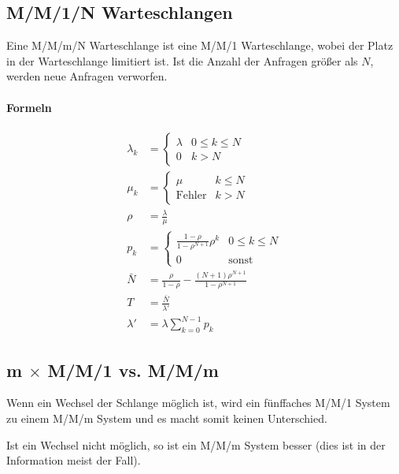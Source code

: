 		\subsection{M/M/1/N Warteschlangen} %
			Eine M/M/m/N Warteschlange ist eine M/M/1 Warteschlange, wobei der Platz in der Warteschlange limitiert ist. Ist die Anzahl der Anfragen größer als \(N\), werden neue Anfragen verworfen.
			
			\paragraph{Formeln}
				\begin{align*}
					\lambda _ k & = \begin{cases}
						\lambda & 0 \leq k \leq N \\
						0       & k > N
					\end{cases} \\
					\mu _ k     & = \begin{cases}
						\mu & k \leq N \\
						\text{Fehler} & k > N
					\end{cases} \\
					\rho        & = \frac{\lambda}{\mu} \\
					p _ k       & = \begin{cases}
						\frac{1 - \rho}{1 - \rho ^ {N + 1}} \rho ^ k & 0 \leq k \leq N \\
						0 & \text{sonst}
					\end{cases} \\
					\bar{N}     & = \frac{\rho}{1 - \rho} - \frac{(N + 1) \rho ^ { N + 1 }}{1 - \rho ^ { N + 1 }} \\
					T           & = \frac{\bar{N}}{\lambda'} \\
					\lambda'    & = \lambda \sum _ { k = 0 } ^ { N - 1 } p _ k
				\end{align*}
		
		\subsection{m \(\times\) M/M/1 vs. M/M/m} %
			Wenn ein Wechsel der Schlange möglich ist, wird ein fünffaches M/M/1 System zu einem M/M/m System und es macht somit keinen Unterschied.
			
			Ist ein Wechsel nicht möglich, so ist ein M/M/m System besser (dies ist in der Information meist der Fall).

